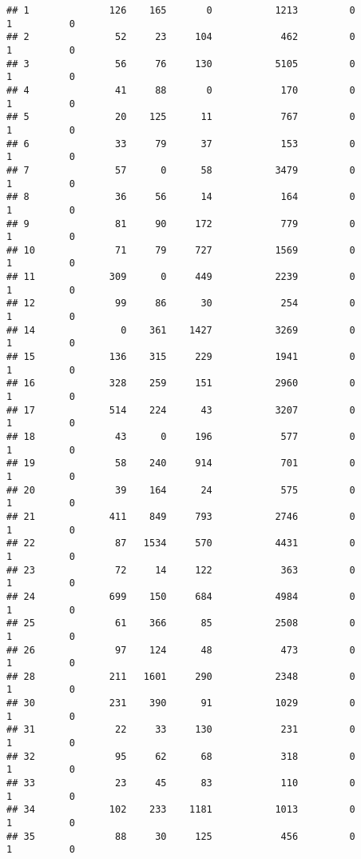 \documentclass[
]{article}
\begin{document}
\begin{verbatim}
## 1              126    165       0           1213         0         1          0
## 2               52     23     104            462         0         1          0
## 3               56     76     130           5105         0         1          0
## 4               41     88       0            170         0         1          0
## 5               20    125      11            767         0         1          0
## 6               33     79      37            153         0         1          0
## 7               57      0      58           3479         0         1          0
## 8               36     56      14            164         0         1          0
## 9               81     90     172            779         0         1          0
## 10              71     79     727           1569         0         1          0
## 11             309      0     449           2239         0         1          0
## 12              99     86      30            254         0         1          0
## 14               0    361    1427           3269         0         1          0
## 15             136    315     229           1941         0         1          0
## 16             328    259     151           2960         0         1          0
## 17             514    224      43           3207         0         1          0
## 18              43      0     196            577         0         1          0
## 19              58    240     914            701         0         1          0
## 20              39    164      24            575         0         1          0
## 21             411    849     793           2746         0         1          0
## 22              87   1534     570           4431         0         1          0
## 23              72     14     122            363         0         1          0
## 24             699    150     684           4984         0         1          0
## 25              61    366      85           2508         0         1          0
## 26              97    124      48            473         0         1          0
## 28             211   1601     290           2348         0         1          0
## 30             231    390      91           1029         0         1          0
## 31              22     33     130            231         0         1          0
## 32              95     62      68            318         0         1          0
## 33              23     45      83            110         0         1          0
## 34             102    233    1181           1013         0         1          0
## 35              88     30     125            456         0         1          0

\end{verbatim}
\end{document}
